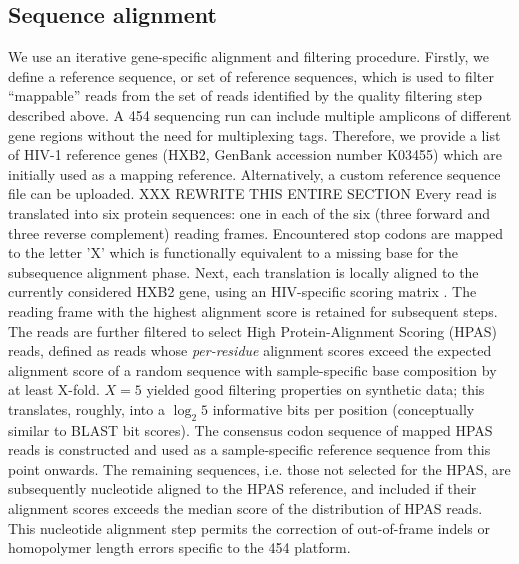\documentclass[10pt]{article}
\begin{document}
\subsection*{Sequence alignment}
We use an iterative gene-specific alignment and filtering procedure.
Firstly, we define a reference sequence, or set of reference sequences,
which is used to filter ``mappable'' reads from the set of reads identified by the quality filtering step described above.
A 454 sequencing run can include multiple amplicons of different gene regions without the need for multiplexing tags.
Therefore, we provide a list of HIV-1 reference genes (HXB2, GenBank accession number K03455) which are initially used as a mapping reference.
Alternatively, a custom reference sequence file can be uploaded.
XXX REWRITE THIS ENTIRE SECTION {
Every read is translated into six protein sequences: one in each of the six (three forward and three reverse complement) reading frames.
Encountered stop codons are mapped to the letter 'X' which is functionally equivalent to a missing base for the subsequence alignment phase.
Next, each translation is locally aligned \cite{Needleman1970} to the currently considered HXB2 gene,
using an HIV-specific scoring matrix \cite{Nickle2007}.
The reading frame with the highest alignment score is retained for subsequent steps.
The reads are further filtered to select High Protein-Alignment Scoring (HPAS) reads,
defined as reads whose \textit{per-residue} alignment scores exceed the expected alignment score of a random sequence
with sample-specific base composition by at least X-fold.
$X=5$ yielded good filtering properties on synthetic data;
this translates, roughly, into a $\log_{2} 5$ informative bits per position (conceptually similar to BLAST bit scores).
The consensus codon sequence of mapped HPAS reads is constructed and used as a sample-specific reference sequence from this point onwards.
The remaining sequences, i.e. those not selected for the HPAS, are subsequently nucleotide aligned to the HPAS reference,
and included if their alignment scores exceeds the median score of the distribution of HPAS reads.
This nucleotide alignment step permits the correction of out-of-frame indels or homopolymer length errors specific to the 454 platform.
}
\end{document}
